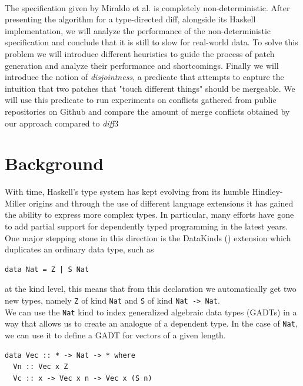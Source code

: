 \documentclass[11pt, titlepage]{article}
\newcommand{\diff}{\emph{diff}}
\begin{document}
\\
The specification given by Miraldo et al. \cite{type-directed-diff} is completely non-deterministic. After presenting the algorithm for a type-directed diff, alongside its Haskell implementation, we will analyze the performance of the non-deterministic specification and conclude that it is still to slow for real-world data. 
To solve this problem we will introduce different heuristics to guide the process of patch generation and analyze their performance and shortcomings.
Finally we will introduce the notion of \emph{disjointness}, a predicate that attempts to capture the intuition that two patches that "touch different things" should be mergeable. We will use this predicate to run experiments on conflicts gathered from public repositories on Github and compare the amount of merge conflicts obtained by our approach compared to \diff3

\section{Background}\label{dependent-types-in-haskell}

With time, Haskell's type system has kept evolving from its humble Hindley-Miller origins and through the use of different language extensions it has gained the ability to express more complex types. In particular, many efforts have gone to add partial support for dependently typed programming in the latest years.
\\
One major stepping stone in this direction is the DataKinds (\cite{datakinds}) extension which duplicates an ordinary data type, such as

\begin{verbatim}
data Nat = Z | S Nat
\end{verbatim}

at the kind level, this means that from this declaration we automatically get two new types, namely \texttt{Z} of kind \texttt{Nat}
and \texttt{S} of kind \texttt{Nat\ -\textgreater{}\ Nat}.
\\
We can use the \texttt{Nat} kind to index generalized algebraic data
types (GADTs) in a way that allows us to create an analogue of a
dependent type. In the case of \texttt{Nat}, we can use it to define a
GADT for vectors of a given length.
\\
\begin{verbatim}
data Vec :: * -> Nat -> * where
  Vn :: Vec x Z
  Vc :: x -> Vec x n -> Vec x (S n)
\end{verbatim}
\end{document}
